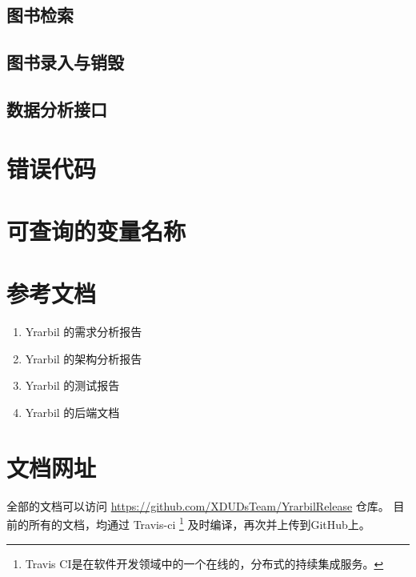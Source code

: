 \documentclass[UTF8]{article}
\begin{document}
        \subsection{图书检索}
        \subsection{图书录入与销毁}

        \subsection{数据分析接口}

		\section{错误代码}

		\section{可查询的变量名称}



    \newpage
    \begin{appendices}
    \section{参考文档}
    \begin{enumerate}
        \item Yrarbil 的需求分析报告
        \item Yrarbil 的架构分析报告
        \item Yrarbil 的测试报告
        \item Yrarbil 的后端文档
    \end{enumerate}
    \section{文档网址}
         全部的文档可以访问 \url{https://github.com/XDUDsTeam/YrarbilRelease} 仓库。
      目前的所有的文档，均通过 Travis-ci
      \footnote{Travis CI是在软件开发领域中的一个在线的，分布式的持续集成服务。}
      及时编译，再次并上传到GitHub上。
      
    \end{appendices}
\end{document}
